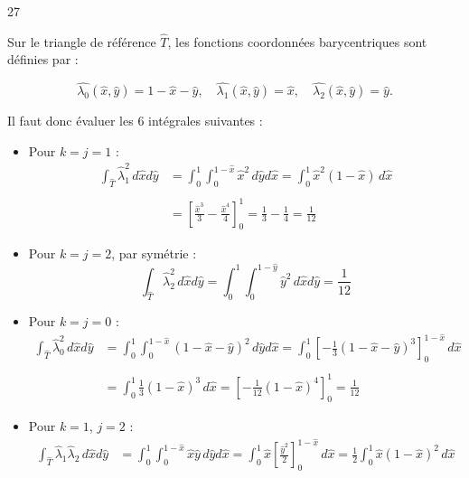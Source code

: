 
\begin{reponse}{27}

Sur le triangle de référence $\hat{T}$, les fonctions coordonnées barycentriques sont définies par :

\[
    \hat{\lambda_0}(\hat{x},\hat{y}) = 1-\hat{x}-\hat{y}, \quad \hat{\lambda_1}(\hat{x},\hat{y}) = \hat{x}, \quad \hat{\lambda_2}(\hat{x},\hat{y}) = \hat{y}.
\]

Il faut donc évaluer les 6 intégrales suivantes :

\begin{itemize}
    \item Pour $k=j=1$ :
        \begin{align*}
            \int_{\hat{T}} \hat{\lambda}_1^2 \, d\hat{x}d\hat{y}  & = \int_0^1 \int_0^{1-\hat{x}} \hat{x}^2 \, d\hat{y}d\hat{x} = \int_0^1 \hat{x}^2 (1 - \hat{x}) \, d\hat{x} \\ \\
            & = \left[ \frac{\hat{x}^3}{3} - \frac{\hat{x}^4}{4} \right]_0^1 = \frac{1}{3} - \frac{1}{4} = \frac{1}{12}
        \end{align*}
    \item Pour $k=j=2$, par symétrie :
        \[
            \int_{\hat{T}} \hat{\lambda}_2^2 \, d\hat{x}d\hat{y} = \int_0^1 \int_0^{1-\hat{y}} \hat{y}^2 \, d\hat{x}d\hat{y} = \frac{1}{12}
        \]
    \item Pour $k=j=0$ :
        \begin{align*}
            \int_{\hat{T}} \hat{\lambda}_0^2 \, d\hat{x}d\hat{y} &= \int_0^1 \int_0^{1-\hat{x}} (1 - \hat{x} - \hat{y})^2 \, d\hat{y}d\hat{x} = \int_0^1 \left[ -\frac{1}{3}(1 - \hat{x} - \hat{y})^3 \right]_0^{1-\hat{x}} \, d\hat{x} \\ \\
            &= \int_0^1 \frac{1}{3}(1 - \hat{x})^3 \, d\hat{x} = \left[ -\frac{1}{12}(1 - \hat{x})^4 \right]_0^1 = \frac{1}{12}
        \end{align*}
    \item Pour $k=1$, $j=2$ : 
        \begin{align*}
            \int_{\hat{T}} \hat{\lambda}_1 \hat{\lambda}_2 \, d\hat{x}d\hat{y} &= \int_0^1 \int_0^{1-\hat{x}} \hat{x} \hat{y} \, d\hat{y}d\hat{x} = \int_0^1 \hat{x} \left[ \frac{\hat{y}^2}{2} \right]_0^{1-\hat{x}} \, d\hat{x} = \frac{1}{2} \int_0^1 \hat{x}(1 - \hat{x})^2 \, d\hat{x} \\ \\

\end{align*}
\end{itemize}
\end{reponse}

